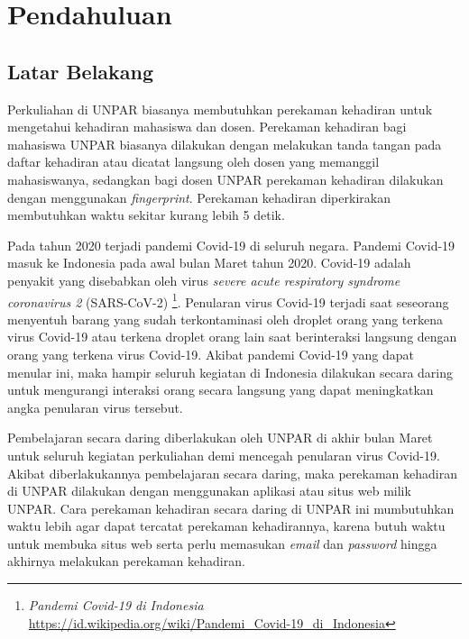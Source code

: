 \chapter{Pendahuluan}
\label{chap:intro}
   
\section{Latar Belakang}
\label{sec:label}
Perkuliahan di UNPAR biasanya membutuhkan perekaman kehadiran untuk mengetahui kehadiran mahasiswa dan dosen. Perekaman kehadiran bagi mahasiswa UNPAR biasanya dilakukan dengan melakukan tanda tangan pada daftar kehadiran atau dicatat langsung oleh dosen yang memanggil mahasiswanya, sedangkan bagi dosen UNPAR perekaman kehadiran dilakukan dengan menggunakan  \textit{fingerprint}. Perekaman kehadiran diperkirakan membutuhkan waktu sekitar kurang lebih 5 detik.

Pada tahun 2020 terjadi pandemi Covid-19 di seluruh negara. Pandemi Covid-19 masuk ke Indonesia pada awal bulan Maret tahun 2020. Covid-19 adalah penyakit yang disebabkan oleh virus \textit{severe acute respiratory syndrome coronavirus 2} (SARS-CoV-2) \footnote{\textit{Pandemi Covid-19 di Indonesia} \url{https://id.wikipedia.org/wiki/Pandemi_Covid-19_di_Indonesia}}. Penularan virus Covid-19 terjadi saat seseorang menyentuh barang yang sudah terkontaminasi oleh droplet orang yang terkena virus Covid-19 atau terkena droplet orang lain saat berinteraksi langsung dengan orang yang terkena virus Covid-19. Akibat pandemi Covid-19 yang dapat menular ini, maka hampir seluruh kegiatan di Indonesia dilakukan secara daring untuk mengurangi interaksi orang secara langsung yang dapat meningkatkan angka penularan virus tersebut. 

Pembelajaran secara daring diberlakukan oleh UNPAR di akhir bulan Maret untuk seluruh kegiatan perkuliahan demi mencegah penularan virus Covid-19. Akibat diberlakukannya pembelajaran secara daring, maka perekaman kehadiran di UNPAR dilakukan dengan menggunakan aplikasi atau situs web milik UNPAR. Cara perekaman kehadiran secara daring di UNPAR ini mumbutuhkan waktu lebih agar dapat tercatat perekaman kehadirannya, karena butuh waktu untuk membuka situs web serta perlu memasukan \textit{email} dan \textit{password} hingga akhirnya melakukan perekaman kehadiran. 

